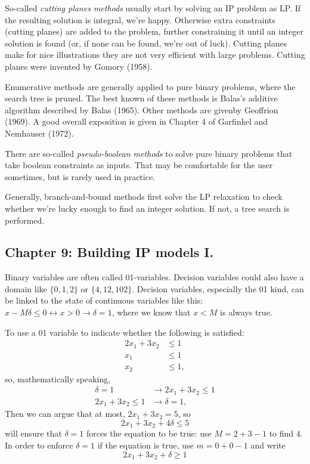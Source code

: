 \documentclass[12pt, landscape]{article}
\begin{document}
So-called \textit{cutting planes methods} usually start by solving an IP problem as LP. If the resulting solution is integral, we're happy. Otherwise extra constraints (cutting planes) are added to the problem, further constraining it until an integer solution is found (or, if none can be found, we're out of luck). Cutting planes make for nice illustrations they are not very efficient with large problems. Cutting planes were invented by Gomory (1958).

Enumerative methods are generally applied to pure binary problems, where the search tree is pruned. The best known of these methods is Balas's additive algorithm described by Balas (1965). Other methods are givenby Geoffrion (1969). A good overall exposition is given in Chapter 4 of Garfinkel and Nemhauser (1972).

There are so-called \textit{pseudo-boolean methods} to solve pure binary problems that take boolean constraints as inputs. That may be comfortable for the user sometimes, but is rarely used in practice.

Generally, branch-and-bound methods first solve the LP relaxation to check whether we're lucky enough to find an integer solution. If not, a tree search is performed. 

\subsection{Chapter 9: Building IP models I.}

Binary variables are often called 01-variables. Decision variables could also have a domain like $\{0,1,2\}$ or $\{4,12,102\}$. Decision variables, especially the 01 kind, can be linked to the state of continuous variables like this: $x-M\delta \leq 0 \leftrightarrow x>0 \rightarrow \delta = 1$, where we know that $x < M$ is always true.

To use a 01 variable to indicate whether the following is satisfied:
\begin{align}
2x_1 + 3x_2 &\leq 1\\
x_1 &\leq 1\\
x_2 &\leq 1,
\end{align}
so, mathematically speaking,
\begin{align}
\delta = 1 &\rightarrow 2x_1 + 3x_2 \leq 1\\
2x_1 + 3x_2 \leq 1 &\rightarrow \delta = 1,
\end{align}
Then we can argue that at most, $2x_1 + 3x_2 = 5$, so
\[
2x_1 + 3x_2 + 4\delta \leq 5
\]
will ensure that $\delta = 1$ forces the equation to be true: use $M = 2 + 3 - 1$ to find $4$. In order to enforce $\delta = 1$ if the equation is true, use $m = 0 + 0 -1$ and write
\[
2x_1 + 3x_2 + \delta \geq 1
\]
\end{document}
